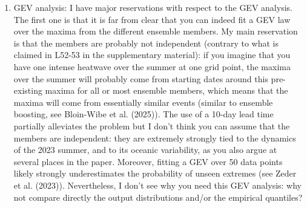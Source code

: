 \documentclass[11pt]{article}
\newcommand{\newTxt}{\textcolor{cadmiumgreen}}
\begin{document}
\begin{enumerate}
    \newTxt{Thank you for bringing up this important issue.  The blurring of the ensemble with long lead times is an important shortcoming of other emulators, such as GraphCast (discussed in \cite{Kochkov2024}) and AIFS \citep{Lang2024}.   In our ensemble, we intentionally validate that our model does not become progressively blurrier at longer lead times, since our interest is in sampling extremes.  We verify that the spectra of our model remains constant with lead time in Figure~10 of \cite{Mahesh2024hugeensemblesidesign}.  Some causes of blurring are the use of autoregressive training or ML models with too few parameters. \cite{Subramanian2026}.  We intentionally make training decisions to mitigate these issues as much as possible.  Through the diagnostic pipeline in \cite{Mahesh2024hugeensemblesidesign} and \cite{Mahesh2024hugeensemblespartii}, we test the models' reliability diagram, Receive Operator Curves (validating the models' ability to discriminate between extremes and non-extremes), its Extreme Forecast Index (the basis for which is the ECMWF supplemental score on extremes), and the threshold and outcome-weighted versions of the continuous ranked probability score. This increases confidence that the model is fit for purpose.}

    \item GEV analysis: I have major reservations with respect to the GEV analysis. The first one is that it is far from clear that you can indeed fit a GEV law over the maxima from the different ensemble members. My main reservation is that the members are probably not independent (contrary to what is claimed in L52-53 in the supplementary material): if you imagine that you have one intense heatwave over the summer at one grid point, the maxima over the summer will probably come from starting dates around this pre-existing maxima for all or most ensemble members, which means that the maxima will come from essentially similar events (similar to ensemble boosting, see Bloin-Wibe et al. (2025)). The use of a 10-day lead time partially alleviates the problem but I don’t think you can assume that the members are independent: they are extremely strongly tied to the dynamics of the 2023 summer, and to its oceanic variability, as you also argue at several places in the paper. Moreover, fitting a GEV over 50 data points likely strongly underestimates the probability of unseen extremes (see Zeder et al. (2023)). Nevertheless, I don’t see why you need this GEV analysis: why not compare directly the output distributions and/or the empirical quantiles?


\end{enumerate}
\end{document}
